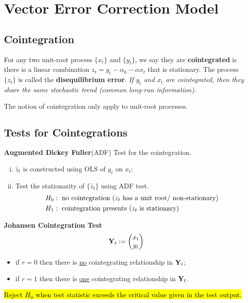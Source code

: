 \documentclass[11pt]{article}
\begin{document}
	    
	\section{Vector Error Correction Model}
		\subsection{Cointegration}
		    \begin{definition}
		        For any two unit-root process $\{x_t\}$ and $\{y_t\}$, we say they are \textbf{cointegrated} is there is a linear combination $z_t = y_t - \alpha_0 - \alpha x_t$ that is stationary. The process $\{z_t\}$ is called the \textbf{disequilibrium error}. \emph{If $y_t$ and $x_t$ are cointegrated, then they share the same stochastic trend (common long-run information).}
		    \end{definition}
		    
		    \begin{remark}
		    	The notion of cointegration only apply to unit-root processes.
		    \end{remark}
		   
		\subsection{Tests for Cointegrations}
		    \begin{remark}
		        \textbf{Augmented Dickey Fuller}(ADF) Test for the cointegration.
		        \begin{enumerate}[(i)]
		            \item $\hat{z}_t$ is constructed using OLS of $y_t$ on $x_t$;
		            \item Test the stationarity of $\{\hat{z}_t\}$ using ADF test.
		            \begin{align}
		                H_0 &: \text{{ no cointegration ($z_t$ has a unit root/ non-stationary)}} \\
		                H_1 &: \text{{ cointegration presents ($z_t$ is stationary)}}
		            \end{align}
		        \end{enumerate}
		    \end{remark}
		    
		    \begin{remark}
		        \textbf{Johansen Cointegration Test}
		        \begin{equation}
		            \textbf{Y}_t := \begin{pmatrix}x_t \\ y_t \end{pmatrix}
		        \end{equation}
		        \begin{itemize}
		            \item if $r=0$ then there is \ul{no} cointegrating relationship in $\textbf{Y}_t$;
		            \item if $r=1$ then there is \ul{one} cointegrating relationship in $\textbf{Y}_t$.
		        \end{itemize}
		        \hl{Reject $H_0$ when test statistic exceeds the critical value given in the test output.}
		    \end{remark}
\end{document}

